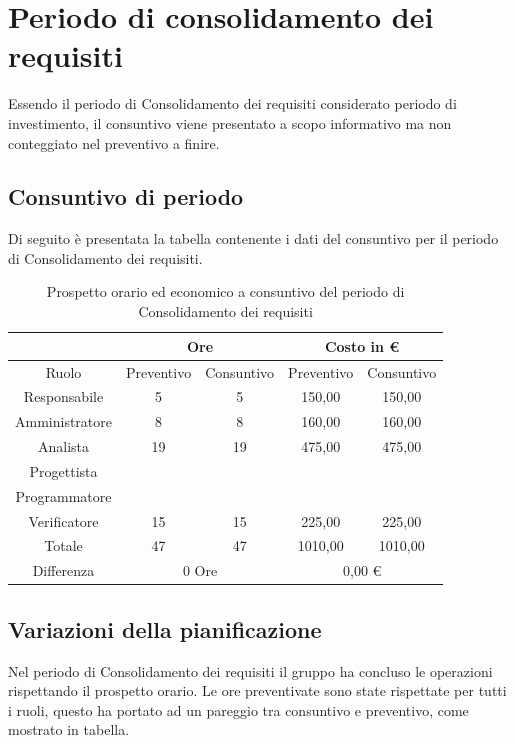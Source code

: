 \documentclass[./PianodiProgetto.tex]{subfiles}
\begin{document}
\section{Periodo di consolidamento dei requisiti}
Essendo il periodo di Consolidamento dei requisiti considerato periodo di investimento, il consuntivo viene presentato a scopo informativo ma non conteggiato nel preventivo a finire.

\subsection{Consuntivo di periodo}
Di seguito è presentata la tabella contenente i dati del consuntivo per il
periodo di Consolidamento dei requisiti.

\begin{table}[H]
	\centering
	\begin{tabular}{|c|c|c|c|c|}
		\hline
		& \multicolumn{2}{c|}{Ore} & \multicolumn{2}{c|}{Costo in \euro{}}  \\ \hline
		Ruolo&Preventivo&Consuntivo&Preventivo&Consuntivo \\ \hline
		Responsabile&5&5&150,00&150,00  \\ \hline
		Amministratore&8&8&160,00&160,00  \\ \hline
		Analista&19&19&475,00&475,00  \\ \hline
		Progettista& & & &  \\ \hline
		Programmatore& & & &  \\ \hline
		Verificatore&15&15&225,00&225,00  \\ \hline
		Totale&47&47&1010,00&1010,00  \\ \hline
		Differenza& \multicolumn{2}{c|}{0 Ore} & \multicolumn{2}{c|}{0,00 \euro{}} \\ \hline
	\end{tabular}
	\caption{Prospetto orario ed economico a consuntivo del periodo di Consolidamento dei requisiti}
\end{table}

\subsection{Variazioni della pianificazione}
Nel periodo di Consolidamento dei requisiti il gruppo ha concluso le operazioni rispettando il prospetto orario. Le ore preventivate sono state rispettate per tutti i ruoli, questo ha portato ad un pareggio tra consuntivo e preventivo, come mostrato in tabella.
\end{document}

